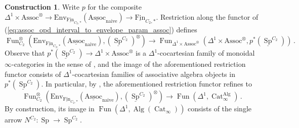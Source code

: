 \documentclass{article}
\DeclareMathOperator{\Alg}{Alg}
\DeclareMathOperator{\Cat}{Cat} %
\DeclareMathOperator{\Fun}{Fun} %
\DeclareMathOperator{\Mod}{Mod} %
\DeclareMathOperator{\Spectra}{Sp} %
\DeclareMathOperator{\Mon}{Mon} %
\newcommand{\Assoc}{\mathrm{Assoc}}
\newcommand{\Fin}{\mathrm{Fin}} %
\theoremstyle{definition}
\newtheorem{definition}[equation]{Definition}
\newtheorem{construction}[equation]{Construction}
\newcommand{\Lucy}[1]{\todo[color=cyan!30]{\footnotesize L: #1}}
\begin{document}
\begin{construction}
    Write $ p $ for the composite $ \Delta^1 \times \Assoc^\otimes \to \mathrm{Env}_{\underline{\Fin}_{C_2,*}}(\underline{\mathrm{Assoc}}_{\mathrm{naive}}) \to \underline{\Fin}_{C_2,*} $. 
    Restriction along the functor of (\ref{eq:assoc_opd_interval_to_envelope_param_assoc}) defines 
    \begin{equation}\label{eq:assoc_alg_norm_in_families}
        \Fun^\otimes_{C_2}\left(\mathrm{Env}_{\underline{\Fin}_{C_2,*}}\left(\underline{\mathrm{Assoc}}_{\mathrm{naive}}\right), \left(\underline{\Spectra}^{C_2}\right)^\otimes\right) \to \Fun_{\Delta^1 \times \Assoc^\otimes}\left(\Delta^1 \times \Assoc^\otimes, p^*\left(\underline{\Spectra}^{C_2}\right)\right) \,.
    \end{equation}
    Observe that $ p^*\left(\underline{\Spectra}^{C_2}\right) \to \Delta^1 \times \Assoc^\otimes $ is a $ \Delta^1 $-cocartesian family of monoidal $ \infty $-categories in the sense of \cite[Definition 4.8.3.1]{LurHA}, and the image of the aforementioned restriction functor consists of $ \Delta^1 $-cocartesian families of associative algebra objects in $ p^*\left(\underline{\Spectra}^{C_2}\right) $. 
    In particular, by \cite[Remark 4.8.3.7]{LurHA}, the aforementioned restriction functor refines to 
    \begin{equation*}
         \Fun^\otimes_{C_2}\left(\mathrm{Env}_{\underline{\Fin}_{C_2,*}}\left(\underline{\mathrm{Assoc}}_{\mathrm{naive}}\right), \left(\underline{\Spectra}^{C_2}\right)^\otimes\right) \to \Fun\left(\Delta^1, \Cat^{\Alg}_\infty \right) \,. 
     \end{equation*} 
     By construction, its image in $ \Fun\left(\Delta^1,\Alg\left(\Cat_\infty\right) \right) $ consists of the single arrow $ N^{C_2} \colon \Spectra \to \Spectra^{C_2} $. 
\end{construction}
\end{document}
